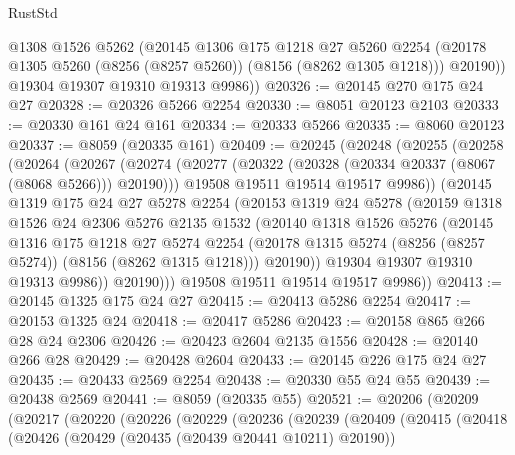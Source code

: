 \begin{lexlean}{RustStd}
\begin{coremodule}
          @1308
          @1526
          @5262
          (@20145
            @1306
            @175
            @1218
            @27
            @5260
            @2254
            (@20178 @1305 @5260 (@8256 (@8257 @5260)) (@8156 (@8262 @1305 @1218)))
            @20190))
        @19304
        @19307
        @19310
        @19313
        @9986))
@20326 := @20145 @270 @175 @24 @27
@20328 := @20326 @5266 @2254
@20330 := @8051 @20123 @2103
@20333 := @20330 @161 @24 @161
@20334 := @20333 @5266
@20335 := @8060 @20123
@20337 := @8059 (@20335 @161)
@20409 := @20245
    (@20248
      (@20255
        (@20258
          (@20264
            (@20267
              (@20274
                (@20277 (@20322 (@20328 (@20334 @20337 (@8067 (@8068 @5266))) @20190)))
                @19508
                @19511
                @19514
                @19517
                @9986))
            (@20145
              @1319
              @175
              @24
              @27
              @5278
              @2254
              (@20153
                @1319
                @24
                @5278
                (@20159
                  @1318
                  @1526
                  @24
                  @2306
                  @5276
                  @2135
                  @1532
                  (@20140
                    @1318
                    @1526
                    @5276
                    (@20145
                      @1316
                      @175
                      @1218
                      @27
                      @5274
                      @2254
                      (@20178 @1315 @5274 (@8256 (@8257 @5274)) (@8156 (@8262 @1315 @1218)))
                      @20190))
                  @19304
                  @19307
                  @19310
                  @19313
                  @9986))
              @20190)))
        @19508
        @19511
        @19514
        @19517
        @9986))
@20413 := @20145 @1325 @175 @24 @27
@20415 := @20413 @5286 @2254
@20417 := @20153 @1325 @24
@20418 := @20417 @5286
@20423 := @20158 @865 @266 @28 @24 @2306
@20426 := @20423 @2604 @2135 @1556
@20428 := @20140 @266 @28
@20429 := @20428 @2604
@20433 := @20145 @226 @175 @24 @27
@20435 := @20433 @2569 @2254
@20438 := @20330 @55 @24 @55
@20439 := @20438 @2569
@20441 := @8059 (@20335 @55)
@20521 := @20206
    (@20209
      (@20217
        (@20220
          (@20226
            (@20229
              (@20236
                (@20239
                  (@20409
                    (@20415
                      (@20418
                        (@20426
                          (@20429 (@20435 (@20439 @20441 @10211) @20190))

\end{coremodule}
\end{lexlean}
